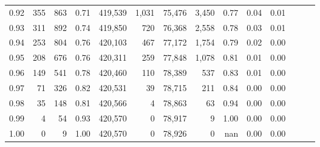\begin{tabular}{rrrrrrrrrrrrrr}
0.92 &    355 &    863 &  0.71 &  419,539 &    1,031 &  75,476 &   3,450 &  0.77 &  0.04 &      0.01 \\
0.93 &    311 &    892 &  0.74 &  419,850 &      720 &  76,368 &   2,558 &  0.78 &  0.03 &      0.01 \\
0.94 &    253 &    804 &  0.76 &  420,103 &      467 &  77,172 &   1,754 &  0.79 &  0.02 &      0.00 \\
0.95 &    208 &    676 &  0.76 &  420,311 &      259 &  77,848 &   1,078 &  0.81 &  0.01 &      0.00 \\
0.96 &    149 &    541 &  0.78 &  420,460 &      110 &  78,389 &     537 &  0.83 &  0.01 &      0.00 \\
0.97 &     71 &    326 &  0.82 &  420,531 &       39 &  78,715 &     211 &  0.84 &  0.00 &      0.00 \\
0.98 &     35 &    148 &  0.81 &  420,566 &        4 &  78,863 &      63 &  0.94 &  0.00 &      0.00 \\
0.99 &      4 &     54 &  0.93 &  420,570 &        0 &  78,917 &       9 &  1.00 &  0.00 &      0.00 \\
1.00 &      0 &      9 &  1.00 &  420,570 &        0 &  78,926 &       0 &   nan &  0.00 &      0.00 \\
\bottomrule
\end{tabular}
